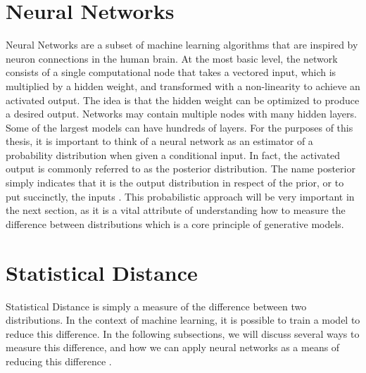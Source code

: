 \section{Neural Networks}
\hspace{0.5in}Neural Networks are a subset of machine learning algorithms that are inspired by neuron connections in the human brain. At the most basic level, the network consists of a single computational node that takes a vectored input, which is multiplied by a hidden weight, and transformed with a non-linearity to achieve an activated output. The idea is that the hidden weight can be optimized to produce a desired output. Networks may contain multiple nodes with many hidden layers. Some of the largest models can have hundreds of layers. For the purposes of this thesis, it is important to think of a neural network as an estimator of a probability distribution when given a conditional input. In fact, the activated output is commonly referred to as the posterior distribution. The name posterior simply indicates that it is the output distribution in respect of the prior, or to put succinctly, the inputs \cite{Goodfellow-et-al-2016}. This probabilistic approach will be very important in the next section, as it is a vital attribute of understanding how to measure the difference between distributions which is a core principle of generative models.

\section{Statistical Distance}
\hspace{0.5in}Statistical Distance is simply a measure of the difference between two distributions. In the context of machine learning, it is possible to train a model to reduce this difference. In the following subsections, we will discuss several ways to measure this difference, and how we can apply neural networks as a means of reducing this difference \cite{Goodfellow-et-al-2016}.

